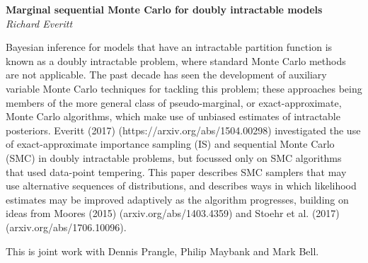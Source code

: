 \documentclass[12pt]{article}
\newcommand{\postertitle}[1]{{\Large\bf #1}\\[12pt]}
\newcommand{\authors}[1]{\emph{#1}\\}
\begin{document}
\begin{center}
\vspace*{0.5cm}
%
\postertitle{Marginal sequential Monte Carlo for doubly intractable models}
%
\authors{Richard Everitt} %
%
\vspace*{0.3cm}
\end{center}

Bayesian inference for models that have an intractable partition function is known as a doubly intractable problem, where standard Monte Carlo methods are not applicable. The past decade has seen the development of auxiliary variable Monte Carlo techniques for tackling this problem; these approaches being members of the more general class of pseudo-marginal, or exact-approximate, Monte Carlo algorithms, which make use of unbiased estimates of intractable posteriors. Everitt (2017) (https://arxiv.org/abs/1504.00298) investigated the use of exact-approximate importance sampling (IS) and sequential Monte Carlo (SMC) in doubly intractable problems, but focussed only on SMC algorithms that used data-point tempering. This paper describes SMC samplers that may use alternative sequences of distributions, and describes ways in which likelihood estimates may be improved adaptively as the algorithm progresses, building on ideas from Moores (2015) (arxiv.org/abs/1403.4359) and Stoehr et al. (2017) (arxiv.org/abs/1706.10096).

This is joint work with Dennis Prangle, Philip Maybank and Mark Bell.
\end{document}
